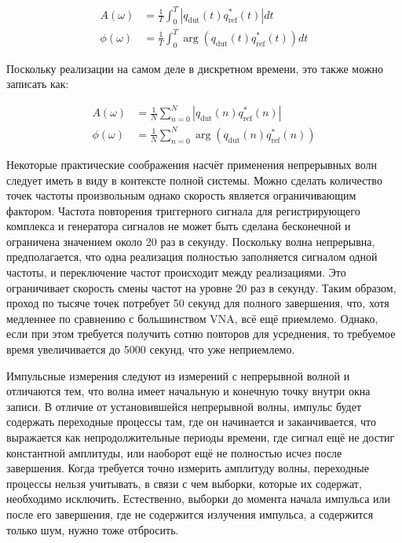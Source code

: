 \documentclass{report}
\begin{document}
\begin{align}
A(\omega) &= \frac{1}{T} \int_{0}^{T} \left| q_\text{dut}(t) q^*_\text{ref}(t) \right| dt \\
\phi(\omega) &= \frac{1}{T} \int_{0}^{T} \arg\left( q_\text{dut}(t) q^*_\text{ref}(t) \right) dt
\end{align}

Поскольку реализации на самом деле в дискретном времени, это также можно записать как:

\begin{align}
A(\omega) &= \frac{1}{N} \sum_{n=0}^{N} \left| q_\text{dut}(n) q^*_\text{ref}(n) \right| \\
\phi(\omega) &= \frac{1}{N} \sum_{n=0}^{N} \arg\left( q_\text{dut}(n) q^*_\text{ref}(n) \right)
\end{align}

Некоторые практические соображения насчёт применения непрерывных волн следует иметь в виду в контексте полной системы. Можно сделать количество точек частоты произвольным однако скорость является ограничивающим фактором. Частота повторения триггерного сигнала для регистрирующего комплекса и генератора сигналов не может быть сделана бесконечной и ограничена значением около 20 раз в секунду. Поскольку волна непрерывна, предполагается, что одна реализация полностью заполняется сигналом одной частоты, и переключение частот происходит между реализациями. Это ограничивает скорость смены частот на уровне 20 раз в секунду. Таким образом, проход по тысяче точек потребует 50 секунд для полного завершения, что, хотя медленнее по сравнению с большинством VNA, всё ещё приемлемо. Однако, если при этом требуется получить сотню повторов для усреднения, то требуемое время увеличивается до 5000 секунд, что уже неприемлемо.

Импульсные измерения следуют из измерений с непрерывной волной и отличаются тем, что волна имеет начальную и конечную точку внутри окна записи. В отличие от установившейся непрерывной волны, импульс будет содержать переходные процессы там, где он начинается и заканчивается, что выражается как непродолжительные периоды времени, где сигнал ещё не достиг константной амплитуды, или наоборот ещё не полностью исчез после завершения. Когда требуется точно измерить амплитуду волны, переходные процессы нельзя учитывать, в связи с чем выборки, которые их содержат, необходимо исключить. Естественно, выборки до момента начала импульса или после его завершения, где не содержится излучения импульса, а содержится только шум, нужно тоже отбросить.
\end{document}
